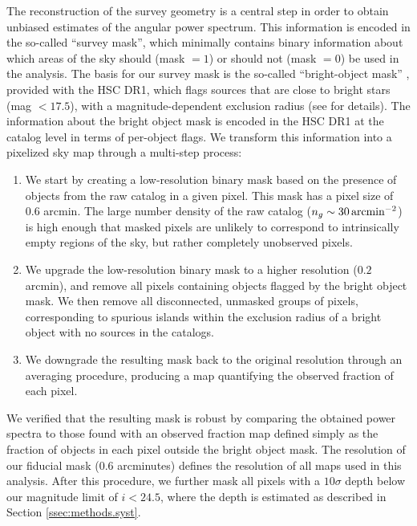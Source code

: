 \documentclass[a4paper,11pt]{article}
\begin{document}
    The reconstruction of the survey geometry is a central step in order to obtain unbiased estimates of the angular power spectrum. This information is encoded in the so-called ``survey mask'', which minimally contains binary information about which areas of the sky should (mask $=1$) or should not (mask $=0$) be used in the analysis. The basis for our survey mask is the so-called ``bright-object mask'' \cite{2018PASJ...70S...7C}, provided with the HSC DR1, which flags sources that are close to bright stars (mag $<17.5$), with a magnitude-dependent exclusion radius (see \cite{2018PASJ...70S...7C} for details). The information about the bright object mask is encoded in the HSC DR1 at the catalog level in terms of per-object flags. We transform this information into a pixelized sky map through a multi-step process:
    \begin{enumerate}
      \item We start by creating a low-resolution binary mask based on the presence of objects from the raw catalog in a given pixel. This mask has a pixel size of 0.6 arcmin. The large number density of the raw catalog  ($n_g\sim30\,{\rm arcmin}^{-2}$) is high enough that masked pixels are unlikely to correspond to intrinsically empty regions of the sky, but rather completely unobserved pixels.
      \item We upgrade the low-resolution binary mask to a higher resolution ($0.2$ arcmin), and remove all pixels containing objects flagged by the bright object mask. We then remove all disconnected, unmasked groups of pixels, corresponding to spurious islands within the exclusion radius of a bright object with no sources in the catalogs.
      \item We downgrade the resulting mask back to the original resolution through an averaging procedure, producing a map quantifying the observed fraction of each pixel.
    \end{enumerate}
    We verified that the resulting mask is robust by comparing the obtained power spectra to those found with an observed fraction map defined simply as the fraction of objects in each pixel outside the bright object mask. The resolution of our fiducial mask ($0.6$ arcminutes) defines the resolution of all maps used in this analysis. After this procedure, we further mask all pixels with a $10\sigma$ depth below our magnitude limit of $i<24.5$, where the depth is estimated as described in Section \ref{ssec:methods.syst}.
\end{document}

